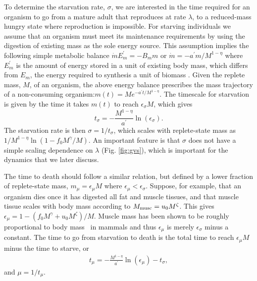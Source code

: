 \documentclass{pnastwo}
\begin{document}
\begin{article}
To determine the starvation rate, $\sigma$, we are interested in the time
required for an organism to go from a mature adult that reproduces at rate
$\lambda$, to a
reduced-mass hungry state where reproduction is impossible.  For starving individuals we assume that an organism must meet its maintenance requirements by using the digestion of existing mass as the sole energy source.
This assumption implies the following simple metabolic balance
$\dot{m}E_{m}^{\prime}=-B_{m}m$ or $\dot{m}=-a^{\prime}m/M^{1-\eta}$
where $E_{m}^{\prime}$ is the amount of energy stored in a unit of existing
body mass, which differs from $E_{m}$, the energy required to
synthesis a unit of biomass \cite{hou}. Given the replete mass, $M$, of an organism, the
above energy balance prescribes the mass trajectory of a non-consuming
organism:$m\left(t\right)=Me^{-a^{\prime}t/M^{1-\eta}}$.
The timescale for starvation is
given by the time it takes $m(t)$ to reach $\epsilon_{\sigma} M$, which gives
\begin{equation}
\label{eq:sigma}
t_{\sigma}=-\frac{M^{1-\eta}}{a^{\prime}}\ln\left(\epsilon_{\sigma}\right).
\end{equation}
The starvation rate is then $\sigma=1/t_{\sigma}$, which scales with
replete-state mass as $1/M^{1-\eta}\ln\left(1-f_{0}M^{\gamma}/M\right)$.  An important
feature is that $\sigma$ does not have a simple scaling dependence on
$\lambda$ (Fig. \ref{fig:gvs}), which is important for the dynamics that we
later discuss.

The time to death should follow a similar relation, but defined by a lower
fraction of replete-state mass, $m_{\mu}=\epsilon_{\mu} M$ where $\epsilon_\mu < \epsilon_\sigma$.
Suppose, for example, that an organism dies once it has digested all fat and
muscle tissues, and that muscle tissue scales with body mass according to
$M_{\rm musc}=u_{0}M^{\zeta}$.  This gives
$\epsilon_{\mu}=1-\left(f_{0}M^{\gamma}+u_{0}M^{\zeta}\right)/M$. Muscle
mass has been shown to be roughly proportional to body mass~\cite{Folland:2008ij} in
mammals and thus $\epsilon_{\mu}$ is merely $\epsilon_{\sigma}$ minus a constant. The time to go from starvation to death is the total time to reach $\epsilon_{\mu}M$ minus the time to starve, or
\begin{eqnarray}
\label{mutimescale}
t_{\mu}=-\frac{M^{1-\eta}}{a^{\prime}}\ln\left(\epsilon_{\mu}\right)-t_{\sigma},
\end{eqnarray}
and $\mu=1/t_{\mu}$.



\end{article}
\end{document}
